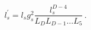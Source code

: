 \begin{equation} l_s^\prime = l_s g_s^2 \frac{l_s^{D-4}}{L_D L_{D-1}  \dots L_5}\, .
\label{lsp}
\end{equation} 

